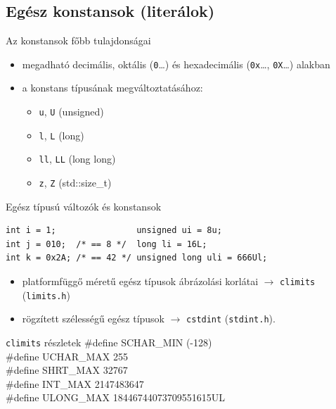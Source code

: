 \documentclass[usenames,dvipsnames,aspectratio=169]{beamer}
\begin{document}
\subsection{Egész konstansok (literálok)}
\begin{frame}[fragile]
  Az  konstansok főbb tulajdonságai
  \begin{itemize}
    \item megadható decimális, oktális (\texttt{0}\dots) és hexadecimális (\texttt{0x}\dots, \texttt{0X}\dots) alakban
    \item {} a konstans típusának megváltoztatásához:
    \begin{itemize}
      \item \texttt{u}, \texttt{U} (unsigned)
      \item \texttt{l}, \texttt{L} (long)
      \item \texttt{ll}, \texttt{LL} (long long)
      \item \texttt{z}, \texttt{Z} (std::size\_t)
    \end{itemize}
  \end{itemize}
  \begin{exampleblock}{Egész típusú változók és konstansok}
    \begin{verbatim}
int i = 1;                unsigned ui = 8u;
int j = 010;  /* == 8 */  long li = 16L;
int k = 0x2A; /* == 42 */ unsigned long uli = 666Ul;
\end{verbatim}
  \end{exampleblock}
\end{frame}

\begin{frame}
  \begin{itemize}
    \item platformfüggő méretű egész típusok ábrázolási korlátai $\to$ \texttt{climits} (\texttt{limits.h})
    \item rögzített szélességű egész típusok $\to$ \texttt{cstdint} (\texttt{stdint.h}).
  \end{itemize}
  \begin{block}{\texttt{climits} részletek}
    \#define SCHAR\_MIN     (-128)\\
    \#define UCHAR\_MAX     255\\
    \#define SHRT\_MAX      32767\\
    \#define INT\_MAX       2147483647\\
    \#define ULONG\_MAX     18446744073709551615UL
  \end{block}
\end{frame}
\end{document}
